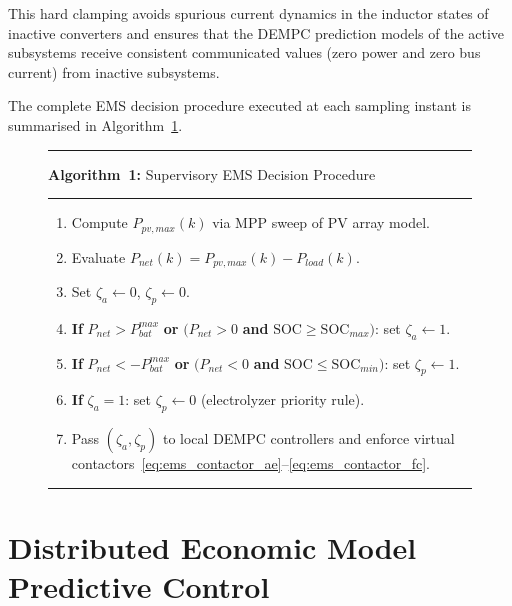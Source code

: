 \documentclass[journal]{IEEEtran}
\begin{document}
This hard clamping avoids spurious current dynamics in the inductor states
of inactive converters and ensures that the DEMPC prediction models of the
active subsystems receive consistent communicated values (zero power and
zero bus current) from inactive subsystems.

The complete EMS decision procedure executed at each sampling instant is
summarised in Algorithm~\ref{alg:ems}.

\begin{figure}[!h]
\centering
\begin{minipage}{0.9\linewidth}
\renewcommand{\arraystretch}{1.2}
\hrule\vspace{4pt}
\textbf{Algorithm~1:} Supervisory EMS Decision Procedure
\vspace{4pt}\hrule\vspace{4pt}
\begin{enumerate}
  \item Compute $P_{pv,max}(k)$ via MPP sweep of PV array model.
  \item Evaluate $P_{net}(k) = P_{pv,max}(k) - P_{load}(k)$.
  \item Set $\zeta_a \leftarrow 0$, $\zeta_p \leftarrow 0$.
  \item \textbf{If} $P_{net} > P_{bat}^{max}$ \textbf{or}
        $(P_{net} > 0$ \textbf{and} $\mathrm{SOC} \geq \mathrm{SOC}_{max})$:
        set $\zeta_a \leftarrow 1$.
  \item \textbf{If} $P_{net} < -P_{bat}^{max}$ \textbf{or}
        $(P_{net} < 0$ \textbf{and} $\mathrm{SOC} \leq \mathrm{SOC}_{min})$:
        set $\zeta_p \leftarrow 1$.
  \item \textbf{If} $\zeta_a = 1$: set $\zeta_p \leftarrow 0$
        (electrolyzer priority rule).
  \item Pass $(\zeta_a, \zeta_p)$ to local DEMPC controllers and
        enforce virtual contactors~\eqref{eq:ems_contactor_ae}--\eqref{eq:ems_contactor_fc}.
\end{enumerate}
\vspace{4pt}\hrule
\end{minipage}
\label{alg:ems}
\end{figure}

\section{Distributed Economic Model Predictive Control}
\label{sec:dempc}
\end{document}
